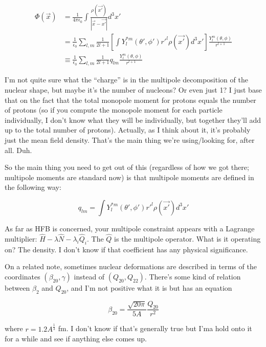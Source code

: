 \begin{align*}
\Phi(\vec{x}) &= \frac{1}{4\pi\epsilon_0}\int\frac{\rho(\vec{x'})}{|\vec{x}-\vec{x'}|}d^3x' \\
&= \frac{1}{\epsilon_0}\sum_{l,m}\frac{1}{2l+1}\left[\int Y_l^{*m}(\theta',\phi')r'^l\rho(\vec{x'})d^3x'\right]\frac{Y_l^m(\theta,\phi)}{r^{l+1}} \\
&\equiv \frac{1}{\epsilon_0}\sum_{l,m}\frac{1}{2l+1}q_{lm}\frac{Y_l^m(\theta,\phi)}{r^{l+1}}
\end{align*}

\noindent I'm not quite sure what the ``charge'' is in the multipole decomposition of the nuclear shape, but maybe it's the number of nucleons? Or even just 1? I just base that on the fact that the total monopole moment for protons equals the number of protons (so if you compute the monopole moment for each particle individually, I don't know what they will be individually, but together they'll add up to the total number of protons). Actually, as I think about it, it's probably just the mean field density. That's the main thing we're using/looking for, after all. Duh.

So the main thing you need to get out of this (regardless of how we got there; multipole moments are standard now) is that multipole moments are defined in the following way:

\begin{equation*}
q_{lm} = \int Y_l^{*m}(\theta',\phi')r'^l\rho(\vec{x'})d^3x'
\end{equation*}

As far as HFB is concerned, your multipole constraint appears with a Lagrange multiplier: $\hat{H} - \lambda\hat{N} - \lambda_i \hat{Q}_i$. The $\hat{Q}$ is the multipole operator. What is it operating on? The density. I don't know if that coefficient has any physical significance.

On a related note, sometimes nuclear deformations are described in terms of the coordinates $(\beta_{20}, \gamma)$ instead of $(Q_{20},Q_{22})$. There's some kind of relation between $\beta_2$ and $Q_{20}$, and I'm not positive what it is but \cite{Giuliani2017} has an equation

\begin{equation*}
\beta_{20} = \frac{\sqrt{20\pi}}{5A}\frac{Q_{20}}{r^2}
\end{equation*}

\noindent where $r=1.2A^\frac{1}{3}$ fm. I don't know if that's generally true but I'ma hold onto it for a while and see if anything else comes up.